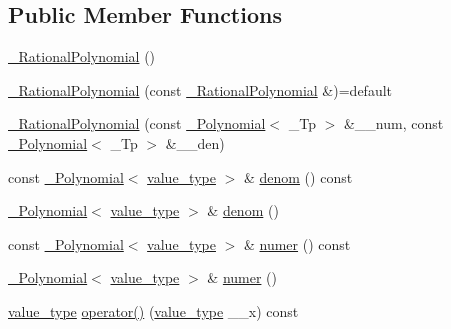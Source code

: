 \subsection*{Public Member Functions}
\begin{DoxyCompactItemize}
\item 
\hyperlink{class____gnu__cxx_1_1__RationalPolynomial_a35b2504272a73aa54b48310004c46fd1}{\+\_\+\+Rational\+Polynomial} ()
\item 
\hyperlink{class____gnu__cxx_1_1__RationalPolynomial_a7a775d294625fb0f5493051579510816}{\+\_\+\+Rational\+Polynomial} (const \hyperlink{class____gnu__cxx_1_1__RationalPolynomial}{\+\_\+\+Rational\+Polynomial} \&)=default
\item 
\hyperlink{class____gnu__cxx_1_1__RationalPolynomial_aef1f631e89bdeb2976b0629591e4e61e}{\+\_\+\+Rational\+Polynomial} (const \hyperlink{class____gnu__cxx_1_1__Polynomial}{\+\_\+\+Polynomial}$<$ \+\_\+\+Tp $>$ \&\+\_\+\+\_\+num, const \hyperlink{class____gnu__cxx_1_1__Polynomial}{\+\_\+\+Polynomial}$<$ \+\_\+\+Tp $>$ \&\+\_\+\+\_\+den)
\item 
const \hyperlink{class____gnu__cxx_1_1__Polynomial}{\+\_\+\+Polynomial}$<$ \hyperlink{class____gnu__cxx_1_1__RationalPolynomial_adeec7f1bec03111031599f337848ee8b}{value\+\_\+type} $>$ \& \hyperlink{class____gnu__cxx_1_1__RationalPolynomial_a05e84913ccfddcf6fcbfe623cb56c937}{denom} () const
\item 
\hyperlink{class____gnu__cxx_1_1__Polynomial}{\+\_\+\+Polynomial}$<$ \hyperlink{class____gnu__cxx_1_1__RationalPolynomial_adeec7f1bec03111031599f337848ee8b}{value\+\_\+type} $>$ \& \hyperlink{class____gnu__cxx_1_1__RationalPolynomial_a81fdcf1099981053c3d08ebcf8e2d278}{denom} ()
\item 
const \hyperlink{class____gnu__cxx_1_1__Polynomial}{\+\_\+\+Polynomial}$<$ \hyperlink{class____gnu__cxx_1_1__RationalPolynomial_adeec7f1bec03111031599f337848ee8b}{value\+\_\+type} $>$ \& \hyperlink{class____gnu__cxx_1_1__RationalPolynomial_aa42ac2f6c2368cae05ba3a3cebf0fa24}{numer} () const
\item 
\hyperlink{class____gnu__cxx_1_1__Polynomial}{\+\_\+\+Polynomial}$<$ \hyperlink{class____gnu__cxx_1_1__RationalPolynomial_adeec7f1bec03111031599f337848ee8b}{value\+\_\+type} $>$ \& \hyperlink{class____gnu__cxx_1_1__RationalPolynomial_ab672b7b5adc77e5937611ea20c9e68b0}{numer} ()
\item 
\hyperlink{class____gnu__cxx_1_1__RationalPolynomial_adeec7f1bec03111031599f337848ee8b}{value\+\_\+type} \hyperlink{class____gnu__cxx_1_1__RationalPolynomial_a964bc37a8932003c8ecd45da84512b2d}{operator()} (\hyperlink{class____gnu__cxx_1_1__RationalPolynomial_adeec7f1bec03111031599f337848ee8b}{value\+\_\+type} \+\_\+\+\_\+x) const

\end{DoxyCompactItemize}
